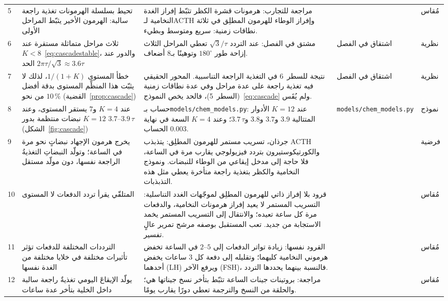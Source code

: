 {\begin{longtable}{>{\raggedright}p{0.5cm}>{\raggedright}p{4.0cm}>{\raggedright}p{5.6cm}>{\raggedright}p{2.3cm}>{\raggedright\arraybackslash}p{1.7cm}}
5 & تحيط بسلسلة الهرمونات تغذية راجعة سالبة: الهرمون الأخير يثبّط المراحل الأولى & مراجعة للتجارب: هرمونات قشرة الكظر تثبّط إفراز الغدة النخامية لـ\foreignlanguage{english}{ACTH} وإفراز الوطاء للهرمون المطلِق في ثلاثة نطاقات زمنية: سريع ومتوسط وبطيء. & \cite{KellerWood1984fb} & مُقاس \\
6 & ثلاث مراحل متماثلة مستقرة عند $K<8$~\eqref{eq:cascadestable}، والدور عند الحد $2\pi\tau/\sqrt3\approx3.6\tau$ & مشتق في الفصل: عند التردد $\sqrt3/\tau$ تعطي المراحل الثلاث إزاحة طور $180^\circ$ وتوهينًا بـ$8$ أضعاف. & اشتقاق في الفصل & نظرية \\
7 & خطأ المستوى $1/(1+K)$، لذلك لا يثبّت هذا المنظِّم المستوى بدقة أفضل من نحو $10\,\%$ (القضية~\ref{prop:cascade}) & نتيجة للسطر~6 في التغذية الراجعة التناسبية. المحور الحقيقي فيه تغذية راجعة على عدة مراحل وفي عدة نطاقات زمنية (السطر~5)، فالحد يخص النموذج~\eqref{eq:cascade} ولم يُقَس. & اشتقاق في الفصل & نظرية \\
8 & عند $K=4$ و$7$ يستقر المستوى، وعند $K=12$ نبضات منتظمة بدور $3.7\text{--}3.9\,\tau$ (الشكل~\ref{fig:cascade}) & حساب بـ\texttt{models/\allowbreak chem\_\allowbreak models.py}: عند $K=12$ الأدوار المتتالية $3.9$ و$3.7$ و$3.8$ و$3.7\,\tau$؛ وعند $K=4$ السعة في نهاية الحساب $0.003$. & \texttt{models/\allowbreak chem\_\allowbreak models.py} & نموذج \\
9 & يخرج هرمون الإجهاد نبضاتٍ نحو مرة في الساعة؛ وتولّد النبضاتِ التغذيةُ الراجعة نفسها، دون مولّد مستقل & جرذان، تسريب مستمر للهرمون المطلِق: يتذبذب \foreignlanguage{english}{ACTH} والكورتيكوستيرون بتردد فيزيولوجي يقارب مرة في الساعة، فلا حاجة إلى مدخل إيقاعي من الوطاء للنبضات. ونموذج النخامية والكظر بتغذية راجعة متأخرة يعطي مثل هذه التذبذبات. & \cite{Walker2012glc, Walker2010} & فرضية \\
10 & المتلقّي يقرأ تردد الدفعات لا المستوى & قرود بلا إفراز ذاتي للهرمون المطلِق لموجّهات الغدد التناسلية: التسريب المستمر لا يعيد إفراز هرمونات النخامية، والدفعات مرة كل ساعة تعيده؛ والانتقال إلى التسريب المستمر يخمد الاستجابة من جديد. تعب المستقبل بوصفه مرشح تمرير عالٍ تفسير. & \cite{Belchetz1978} & مُقاس \\
11 & الترددات المختلفة للدفعات تؤثر تأثيرات مختلفة في خلايا مختلفة من الغدة نفسها & القرود نفسها: زيادة تواتر الدفعات إلى $2\text{--}5$ في الساعة تخفض هرموني النخامية كليهما؛ وتقليله إلى دفعة كل $3$ ساعات يخفض أحدهما (\foreignlanguage{english}{LH}) ويرفع الآخر (\foreignlanguage{english}{FSH})، فالنسبة بينهما يحددها التردد. & \cite{Wildt1981gnrh} & مُقاس \\
12 & يولّد الإيقاعَ اليومي تغذيةٌ راجعة سالبة داخل الخلية بتأخر عدة ساعات & مراجعة: بروتينات جينات الساعة تثبّط بتأخر نسخ جيناتها هي؛ والحلقة من النسخ والترجمة تعطي دورًا يقارب يومًا. & \cite{TakahashiJS2017} & مُقاس \\

\end{longtable}}
